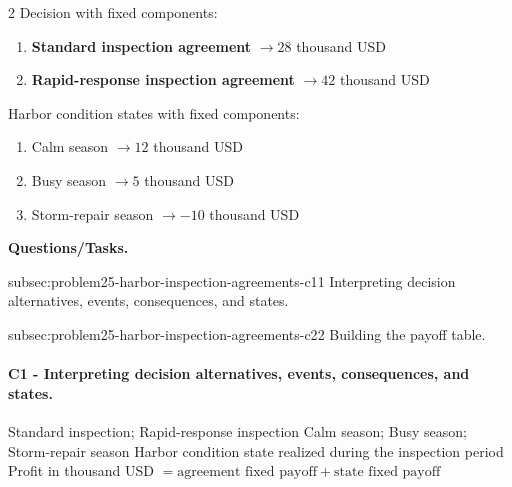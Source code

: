 	\begin{multicols}{2}
		Decision  with fixed  components:
		\begin{enumerate}[label=\arabic*.]
			\item \textbf{Standard inspection agreement} $\to 28$ thousand USD
			\item \textbf{Rapid-response inspection agreement} $\to 42$ thousand USD
		\end{enumerate}

			\columnbreak

		Harbor condition states with fixed  components:
		\begin{enumerate}[label=\arabic*.]
			\item Calm season $\to 12$ thousand USD
			\item Busy season $\to 5$ thousand USD
			\item Storm-repair season $\to -10$ thousand USD
		\end{enumerate}
	\end{multicols}

	\textbf{Questions/Tasks.}
	\begin{enumerate}
		\CriterionTask
		{subsec:problem25-harbor-inspection-agreements-c1}{1}
		{Interpreting decision alternatives, events, consequences, and states.}

		\CriterionTask
		{subsec:problem25-harbor-inspection-agreements-c2}{2}
		{Building the payoff table.}
	\end{enumerate}

	\paragraph*{C1 - Interpreting decision alternatives, events, consequences, and states.}
	\label{subsec:problem25-harbor-inspection-agreements-c1}
	\DecisionElementsTable
	{Standard inspection; Rapid-response inspection}
	{Calm season; Busy season; Storm-repair season}
	{Harbor condition state realized during the inspection period}
	{Profit in thousand USD $= \text{agreement fixed payoff} + \text{state fixed payoff}$}



